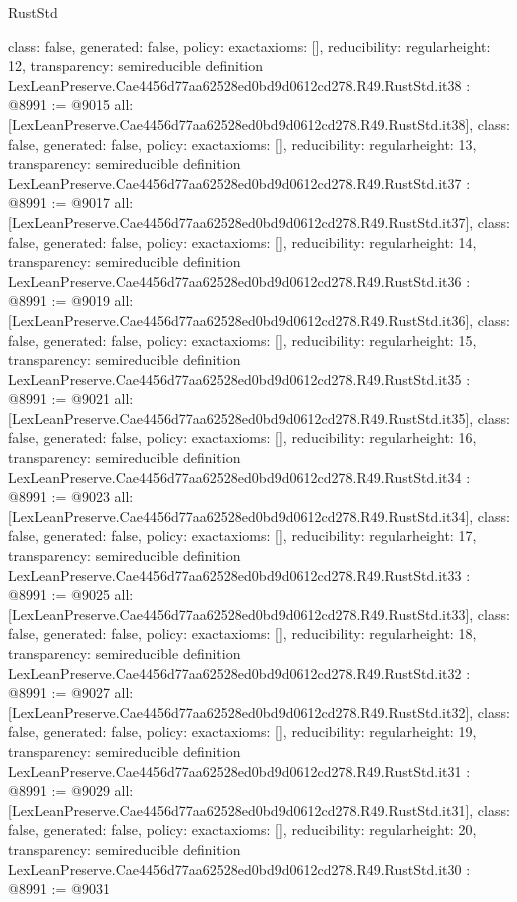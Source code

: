 \begin{lexlean}{RustStd}
\begin{coremodule}
{  class: false,
  generated: false,
  policy: exact{axioms: []},
  reducibility: regular{height: 12},
  transparency: semireducible
}
definition LexLeanPreserve.Cae4456d77aa62528ed0bd9d0612cd278.R49.RustStd.it38 : @8991 := @9015 {
  all: [LexLeanPreserve.Cae4456d77aa62528ed0bd9d0612cd278.R49.RustStd.it38],
  class: false,
  generated: false,
  policy: exact{axioms: []},
  reducibility: regular{height: 13},
  transparency: semireducible
}
definition LexLeanPreserve.Cae4456d77aa62528ed0bd9d0612cd278.R49.RustStd.it37 : @8991 := @9017 {
  all: [LexLeanPreserve.Cae4456d77aa62528ed0bd9d0612cd278.R49.RustStd.it37],
  class: false,
  generated: false,
  policy: exact{axioms: []},
  reducibility: regular{height: 14},
  transparency: semireducible
}
definition LexLeanPreserve.Cae4456d77aa62528ed0bd9d0612cd278.R49.RustStd.it36 : @8991 := @9019 {
  all: [LexLeanPreserve.Cae4456d77aa62528ed0bd9d0612cd278.R49.RustStd.it36],
  class: false,
  generated: false,
  policy: exact{axioms: []},
  reducibility: regular{height: 15},
  transparency: semireducible
}
definition LexLeanPreserve.Cae4456d77aa62528ed0bd9d0612cd278.R49.RustStd.it35 : @8991 := @9021 {
  all: [LexLeanPreserve.Cae4456d77aa62528ed0bd9d0612cd278.R49.RustStd.it35],
  class: false,
  generated: false,
  policy: exact{axioms: []},
  reducibility: regular{height: 16},
  transparency: semireducible
}
definition LexLeanPreserve.Cae4456d77aa62528ed0bd9d0612cd278.R49.RustStd.it34 : @8991 := @9023 {
  all: [LexLeanPreserve.Cae4456d77aa62528ed0bd9d0612cd278.R49.RustStd.it34],
  class: false,
  generated: false,
  policy: exact{axioms: []},
  reducibility: regular{height: 17},
  transparency: semireducible
}
definition LexLeanPreserve.Cae4456d77aa62528ed0bd9d0612cd278.R49.RustStd.it33 : @8991 := @9025 {
  all: [LexLeanPreserve.Cae4456d77aa62528ed0bd9d0612cd278.R49.RustStd.it33],
  class: false,
  generated: false,
  policy: exact{axioms: []},
  reducibility: regular{height: 18},
  transparency: semireducible
}
definition LexLeanPreserve.Cae4456d77aa62528ed0bd9d0612cd278.R49.RustStd.it32 : @8991 := @9027 {
  all: [LexLeanPreserve.Cae4456d77aa62528ed0bd9d0612cd278.R49.RustStd.it32],
  class: false,
  generated: false,
  policy: exact{axioms: []},
  reducibility: regular{height: 19},
  transparency: semireducible
}
definition LexLeanPreserve.Cae4456d77aa62528ed0bd9d0612cd278.R49.RustStd.it31 : @8991 := @9029 {
  all: [LexLeanPreserve.Cae4456d77aa62528ed0bd9d0612cd278.R49.RustStd.it31],
  class: false,
  generated: false,
  policy: exact{axioms: []},
  reducibility: regular{height: 20},
  transparency: semireducible
}
definition LexLeanPreserve.Cae4456d77aa62528ed0bd9d0612cd278.R49.RustStd.it30 : @8991 := @9031 {
}
\end{coremodule}
\end{lexlean}
